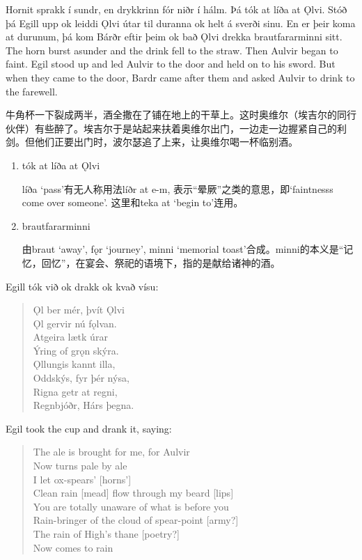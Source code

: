 \begin{paracol}{2}
  Hornit sprakk í sundr, en drykkrinn fór niðr í hálm. Þá tók at líða at Ǫlvi. Stóð þá Egill upp ok leiddi Ǫlvi útar til duranna ok helt á sverði sinu. En er þeir koma at durunum, þá kom Bárðr eftir þeim ok bað Ǫlvi drekka brautfararminni sitt.
  \switchcolumn
  The horn burst asunder and the drink fell to the straw. Then Aulvir began to faint. Egil stood up and led Aulvir to the door and held on to his sword. But when they came to the door, Bardr came after them and asked Aulvir to drink to the farewell.
\end{paracol}
\begin{translation*}{}
  牛角杯一下裂成两半，酒全撒在了铺在地上的干草上。这时奥维尔（埃吉尔的同行伙伴）有些醉了。埃吉尔于是站起来扶着奥维尔出门，一边走一边握紧自己的利剑。但他们正要出门时，波尔瑟追了上来，让奥维尔喝一杯临别酒。
\end{translation*}
\begin{grammar*}{}
  \begin{enumerate}[leftmargin=*]
    \item tók at líða at Ǫlvi

          líða `pass'有无人称用法líðr at e-m, 表示“晕厥”之类的意思，即`faintnesss come over someone'. 这里和teka at `begin to'连用。

    \item brautfararminni

          由braut `away', fǫr `journey', minni `memorial toast'合成。minni的本义是“记忆，回忆”，在宴会、祭祀的语境下，指的是献给诸神的酒。
  \end{enumerate}
\end{grammar*}
\begin{paracol}{2}
  Egill tók við ok drakk ok kvað vísu:
  \begin{quote}
    Ǫl ber mér, þvít Ǫlvi\\
    Ǫl gervir nú fǫlvan.\\
    Atgeira lætk úrar\\
    Ýring of grǫn skýra.\\
    Ǫllungis kannt illa,\\
    Oddskýs, fyr þér nýsa,\\
    Rigna getr at regni,\\
    Regnbjóðr, Hárs þegna.
  \end{quote}

  \switchcolumn
  Egil took the cup and drank it, saying:
  \begin{quote}
    The ale is brought for me, for Aulvir\\
    Now turns pale by ale\\
    I let ox-spears' [horns']\\
    Clean rain [mead] flow through my beard [lips]\\
    You are totally unaware of what is before you\\
    Rain-bringer of the cloud of spear-point [army?]\\
    The rain of High's thane [poetry?] \\
    Now comes to rain
  \end{quote}
\end{paracol}

